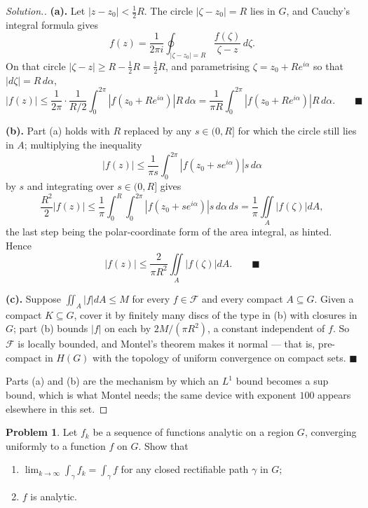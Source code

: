 \documentclass[11pt,a4paper]{article}
\theoremstyle{definition}
\newtheorem{problemx}{Problem}[section]
\newenvironment{problem}{\begin{problemx}}{\end{problemx}}
\newenvironment{solution}
  {\renewcommand{\qedsymbol}{}\begin{proof}[\textit{Solution}.]}
  {\end{proof}}
\begin{document}
\begin{solution}
\textbf{(a).} Let $\left|z - z_0\right| < \tfrac12 R$. The circle
$\left|\zeta - z_0\right| = R$ lies in $G$, and Cauchy's integral formula gives
$$f(z) = \frac{1}{2\pi i}\oint_{\left|\zeta-z_0\right|=R}
\frac{f(\zeta)}{\zeta - z}\,d\zeta .$$
On that circle $\left|\zeta - z\right| \geq R - \tfrac12 R = \tfrac12 R$, and
parametrising $\zeta = z_0 + Re^{i\alpha}$ so that
$\left|d\zeta\right| = R\,d\alpha$,
$$\left|f(z)\right| \leq \frac{1}{2\pi}\cdot\frac{1}{R/2}
\int^{2\pi}_{0}\left|f\!\left(z_0+Re^{i\alpha}\right)\right| R\,d\alpha
= \frac{1}{\pi R}\int^{2\pi}_{0}
\left|f\!\left(z_0+Re^{i\alpha}\right)\right| R\,d\alpha . \qquad\blacksquare$$

\textbf{(b).} Part (a) holds with $R$ replaced by any $s \in (0,R]$ for which the
circle still lies in $A$; multiplying the inequality
$$\left|f(z)\right| \leq \frac{1}{\pi s}\int^{2\pi}_{0}
\left|f\!\left(z_0+se^{i\alpha}\right)\right| s\,d\alpha$$
by $s$ and integrating over $s \in (0,R]$ gives
$$\frac{R^{2}}{2}\left|f(z)\right|
\leq \frac{1}{\pi}\int^{R}_{0}\!\!\int^{2\pi}_{0}
\left|f\!\left(z_0+se^{i\alpha}\right)\right| s\,d\alpha\,ds
= \frac{1}{\pi}\iint\limits_{A}\left|f(\zeta)\right|dA,$$
the last step being the polar-coordinate form of the area integral, as hinted.
Hence
$$\left|f(z)\right| \leq \frac{2}{\pi R^{2}}\iint\limits_{A}
\left|f(\zeta)\right| dA . \qquad\blacksquare$$

\textbf{(c).} Suppose $\iint_A\left|f\right|dA \leq M$ for every
$f \in \mathcal{F}$ and every compact $A \subseteq G$. Given a compact
$K \subseteq G$, cover it by finitely many discs of the type in (b) with closures
in $G$; part (b) bounds $\left|f\right|$ on each by $2M/(\pi R^{2})$, a constant
independent of $f$. So $\mathcal{F}$ is locally bounded, and Montel's theorem makes
it normal --- that is, pre-compact in $H(G)$ with the topology of uniform
convergence on compact sets. $\blacksquare$

Parts (a) and (b) are the mechanism by which an $L^{1}$ bound becomes a sup bound,
which is what Montel needs; the same device with exponent $100$ appears elsewhere
in this set.
\end{solution}


\begin{problem}
Let $f_k$ be a sequence of functions analytic on a region $G$, converging
uniformly to a function $f$ on $G$. Show that
\begin{enumerate}
\item[(a).] $\displaystyle\lim_{k \rightarrow \infty}\int_{\gamma} f_k
= \int_{\gamma} f$ for any closed rectifiable path $\gamma$ in $G$;
\item[(b).] $f$ is analytic.
\end{enumerate}
\end{problem}
\end{document}

